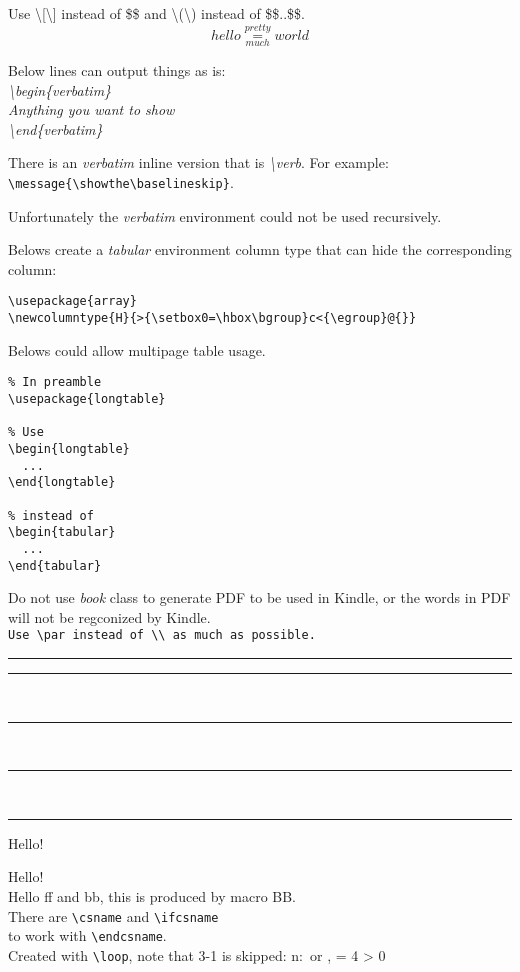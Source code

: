 \documentclass[fleqn]{minimal}
\newcommand\B{\textbackslash}
\newcommand\small{\fontsize{7pt}{7pt}\selectfont}
\def\BB[#1](#2){Hello #1 and #2, this is produced by macro BB.}
\begin{document}
Use {\small\B[\B]} instead of \$\$ and {\small\B(\B)} instead of \$\$..\$\$.
\[ hello\overset{pretty}{\underset{much}{=}}world \]

Below lines can output things as is:\\
\textit{\small
\B{begin\{verbatim\}}\\
\hspace*{2ex}Anything you want to show\\
\B{end\{verbatim\}}
}

\par
There is an \emph{verbatim} inline version that is \emph{\B{verb}}.
For example: \verb|\message{\showthe\baselineskip}|.
\par
Unfortunately the \emph{verbatim} environment could not be used recursively.
\par
Belows create a \emph{tabular} environment column type that can hide the corresponding column:
\par
{\small
\begin{verbatim}
\usepackage{array}
\newcolumntype{H}{>{\setbox0=\hbox\bgroup}c<{\egroup}@{}}
\end{verbatim}
}
\par
Belows could allow multipage table usage.
{\small
\begin{verbatim}
% In preamble
\usepackage{longtable}

% Use
\begin{longtable}
  ...
\end{longtable}

% instead of
\begin{tabular}
  ...
\end{tabular}
\end{verbatim}
}
Do not use \emph{book} class to generate PDF to be used in Kindle, or the words in PDF will not be regconized by Kindle.\\
\verb|Use \par instead of \\ as much as possible.|

\rule[0.5\parskip]{4cm}{0.5pt}

\textcolor{gray}{\rule{0.4pt}{\parskip}~{\rule{0.4pt}{\parskip}}~{\rule{0.4pt}{\parskip}}~{\rule{0.4pt}{\parskip}}}

\makebox[\linewidth]{\rule{\paperwidth}{0.4pt}}

Hello!{\setlength\fboxsep{0pt}}

Hello!\\
\BB[ff](bb)\\
There are \verb|\csname| and \verb|\ifcsname|\\ to work with \verb|\endcsname|.\\
Created with \verb|\loop|, note that 3-1 is skipped:
\newcount\foo
{}
\loop
  \advance{}\relax
  n:\the\foo~or \number\foo,
  \ifnum \foo = 4 \relax\fi
\ifnum \foo > 0
\repeat
\let\foo=\relax
\end{document}
